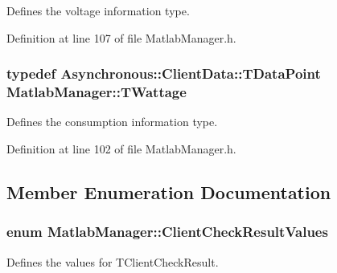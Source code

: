 Defines the voltage information type. 



Definition at line 107 of file Matlab\-Manager.\-h.

\hypertarget{class_matlab_manager_a410b78f356aeacba5c43efee93d8c27d}{
\subsubsection[{T\-Wattage}]{\setlength{\rightskip}{0pt plus 5cm}typedef {\bf Asynchronous\-::\-Client\-Data\-::\-T\-Data\-Point} {\bf Matlab\-Manager\-::\-T\-Wattage}}}\label{class_matlab_manager_a410b78f356aeacba5c43efee93d8c27d}


Defines the consumption information type. 



Definition at line 102 of file Matlab\-Manager.\-h.



\subsection{Member Enumeration Documentation}
\hypertarget{class_matlab_manager_a3030ee8380a9c54563d3ba494b2ac5bd}{
\subsubsection[{Client\-Check\-Result\-Values}]{\setlength{\rightskip}{0pt plus 5cm}enum {\bf Matlab\-Manager\-::\-Client\-Check\-Result\-Values}\hspace{0.3cm}{\ttfamily [private]}}}\label{class_matlab_manager_a3030ee8380a9c54563d3ba494b2ac5bd}


Defines the values for T\-Client\-Check\-Result. 

